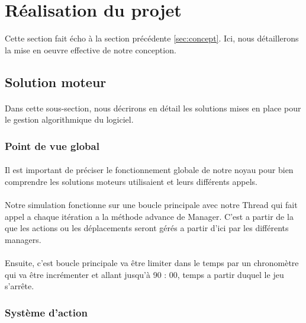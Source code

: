 \newpage
\section{Réalisation du projet}
\label{sec:realisation}

\noindent Cette section fait écho à la section précédente \ref{sec:concept}. Ici, nous détaillerons la mise en oeuvre effective de notre conception.

\subsection{Solution moteur}

\paragraph{}
    Dans cette sous-section, nous décrirons en détail les solutions mises en place pour le gestion algorithmique du logiciel.

\subsubsection{Point de vue global}

\paragraph{}
    Il est important de préciser le fonctionnement globale de notre noyau pour bien comprendre les solutions moteurs utilisaient et leurs différents appels.

\paragraph{}  
    Notre simulation fonctionne sur une boucle principale avec notre Thread qui fait appel a chaque itération a la méthode advance de Manager. C'est a partir de la que les actions ou les déplacements seront gérés a partir d'ici par les différents managers.

\paragraph{}
    Ensuite, c'est boucle principale va être limiter dans le temps par un chronomètre qui va être incrémenter et allant jusqu'à 90 : 00, temps a partir duquel le jeu s'arrête.


\subsubsection{Système d'action}

